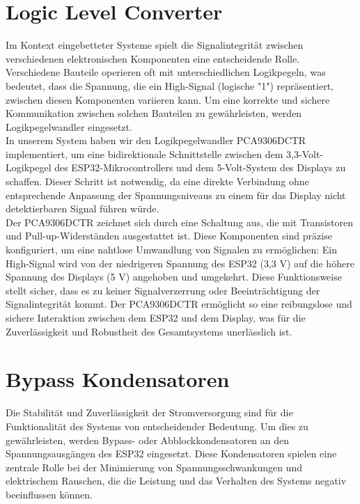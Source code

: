 \section{Logic Level Converter}
\noindent Im Kontext eingebetteter Systeme spielt die Signalintegrität zwischen verschiedenen elektronischen Komponenten eine entscheidende Rolle. Verschiedene Bauteile operieren oft mit unterschiedlichen Logikpegeln, was bedeutet, dass die Spannung, die ein High-Signal (logische "1") repräsentiert, zwischen diesen Komponenten variieren kann. Um eine korrekte und sichere Kommunikation zwischen solchen Bauteilen zu gewährleisten, werden Logikpegelwandler eingesetzt.\\

\noindent In unserem System haben wir den Logikpegelwandler PCA9306DCTR implementiert, um eine bidirektionale Schnittstelle zwischen dem 3,3-Volt-Logikpegel des ESP32-Mikrocontrollers und dem 5-Volt-System des Displays zu schaffen. Dieser Schritt ist notwendig, da eine direkte Verbindung ohne entsprechende Anpassung der Spannungsniveaus zu einem für das Display nicht detektierbaren Signal führen würde.\\

\noindent Der PCA9306DCTR zeichnet sich durch eine Schaltung aus, die mit Transistoren und Pull-up-Widerständen ausgestattet ist. Diese Komponenten sind präzise konfiguriert, um eine nahtlose Umwandlung von Signalen zu ermöglichen: Ein High-Signal wird von der niedrigeren Spannung des ESP32 (3,3 V) auf die höhere Spannung des Displays (5 V) angehoben und umgekehrt. Diese Funktionsweise stellt sicher, dass es zu keiner Signalverzerrung oder Beeinträchtigung der Signalintegrität kommt. Der PCA9306DCTR ermöglicht so eine reibungslose und sichere Interaktion zwischen dem ESP32 und dem Display, was für die Zuverlässigkeit und Robustheit des Gesamtsystems unerlässlich ist.\\

\section{Bypass Kondensatoren}
Die Stabilität und Zuverlässigkeit der Stromversorgung sind für die Funktionalität des Systems von entscheidender Bedeutung. Um dies zu gewährleisten, werden Bypass- oder Abblockkondensatoren an den Spannungsausgängen des ESP32 eingesetzt. Diese Kondensatoren spielen eine zentrale Rolle bei der Minimierung von Spannungsschwankungen und elektrischem Rauschen, die die Leistung und das Verhalten des Systems negativ beeinflussen können.\\

